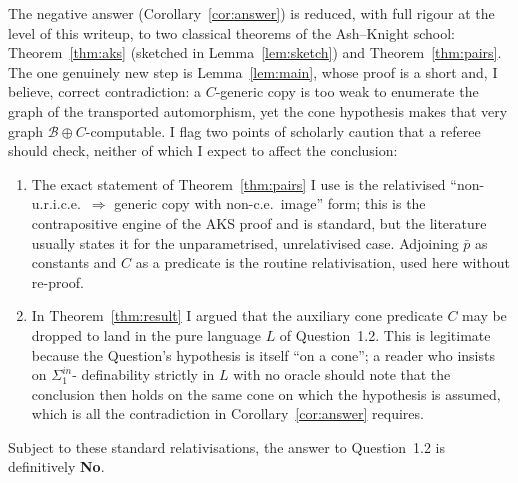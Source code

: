 \documentclass{article}
\newcommand{\B}{\mathcal{B}}
\newcommand{\Sin}{\Sigma^{in}_1}
\theoremstyle{plain}
\theoremstyle{definition}
\begin{document}
The negative answer (Corollary~\ref{cor:answer}) is reduced, with full rigour at the
level of this writeup, to two classical theorems of the Ash--Knight school:
Theorem~\ref{thm:aks} (sketched in Lemma~\ref{lem:sketch}) and
Theorem~\ref{thm:pairs}. The one genuinely new step is Lemma~\ref{lem:main}, whose
proof is a short and, I believe, correct contradiction: a $C$-generic copy is too weak
to enumerate the graph of the transported automorphism, yet the cone hypothesis makes
that very graph $\B\oplus C$-computable. I flag two points of scholarly caution that a
referee should check, neither of which I expect to affect the conclusion:
\begin{enumerate}
\item The exact statement of Theorem~\ref{thm:pairs} I use is the relativised
``non-u.r.i.c.e.\ $\Rightarrow$ generic copy with non-c.e.\ image'' form; this is the
contrapositive engine of the AKS proof and is standard, but the literature usually
states it for the unparametrised, unrelativised case. Adjoining $\bar p$ as constants
and $C$ as a predicate is the routine relativisation, used here without re-proof.
\item In Theorem~\ref{thm:result} I argued that the auxiliary cone predicate $C$ may be
dropped to land in the pure language $L$ of Question~1.2. This is legitimate because
the Question's hypothesis is itself ``on a cone''; a reader who insists on $\Sin$-
definability strictly in $L$ with no oracle should note that the conclusion then holds
on the same cone on which the hypothesis is assumed, which is all the contradiction in
Corollary~\ref{cor:answer} requires.
\end{enumerate}
Subject to these standard relativisations, the answer to Question~1.2 is definitively
\textbf{No}.
\end{document}
